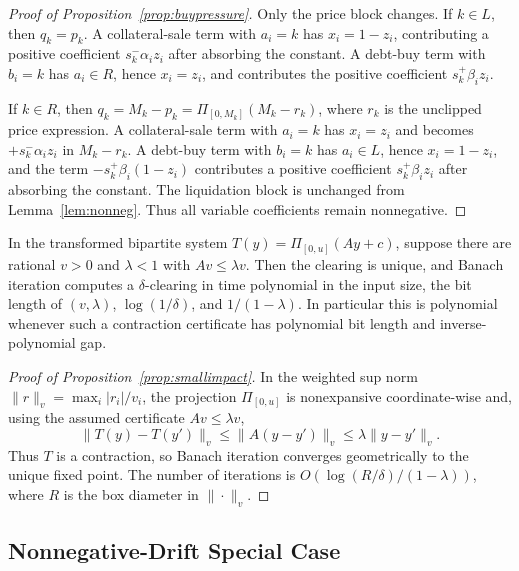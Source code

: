 \documentclass{llncs}
\newcommand{\clip}{\Pi}
\begin{document}
\begin{proof}[Proof of Proposition~\ref{prop:buypressure}]
Only the price block changes. If \(k\in L\), then \(q_k=p_k\). A collateral-sale term with \(a_i=k\) has \(x_i=1-z_i\), contributing a positive coefficient \(s_k^-\alpha_i z_i\) after absorbing the constant. A debt-buy term with \(b_i=k\) has \(a_i\in R\), hence \(x_i=z_i\), and contributes the positive coefficient \(s_k^+\beta_i z_i\).

If \(k\in R\), then \(q_k=M_k-p_k=\clip_{[0,M_k]}(M_k-r_k)\), where \(r_k\) is the unclipped price expression. A collateral-sale term with \(a_i=k\) has \(x_i=z_i\) and becomes \(+s_k^-\alpha_i z_i\) in \(M_k-r_k\). A debt-buy term with \(b_i=k\) has \(a_i\in L\), hence \(x_i=1-z_i\), and the term \(-s_k^+\beta_i(1-z_i)\) contributes a positive coefficient \(s_k^+\beta_i z_i\) after absorbing the constant. The liquidation block is unchanged from Lemma~\ref{lem:nonneg}. Thus all variable coefficients remain nonnegative.
\end{proof}

\begin{proposition}
\label{prop:smallimpact}
In the transformed bipartite system \(T(y)=\clip_{[0,u]}(Ay+c)\), suppose there are rational \(v>0\) and \(\lambda<1\) with \(Av\le\lambda v\). Then the clearing is unique, and Banach iteration computes a \(\delta\)-clearing in time polynomial in the input size, the bit length of \((v,\lambda)\), \(\log(1/\delta)\), and \(1/(1-\lambda)\). In particular this is polynomial whenever such a contraction certificate has polynomial bit length and inverse-polynomial gap.
\end{proposition}

\begin{proof}[Proof of Proposition~\ref{prop:smallimpact}]
In the weighted sup norm \(\|r\|_v=\max_i |r_i|/v_i\), the projection \(\clip_{[0,u]}\) is nonexpansive coordinate-wise and, using the assumed certificate \(Av\le\lambda v\),
\[
   \|T(y)-T(y')\|_v\le \|A(y-y')\|_v\le \lambda \|y-y'\|_v .
\]
Thus \(T\) is a contraction, so Banach iteration converges geometrically to the unique fixed point. The number of iterations is \(O(\log(R/\delta)/(1-\lambda))\), where \(R\) is the box diameter in \(\|\cdot\|_v\).
\end{proof}

\subsection{Nonnegative-Drift Special Case}
\label{app:nonneg-special}
\end{document}
